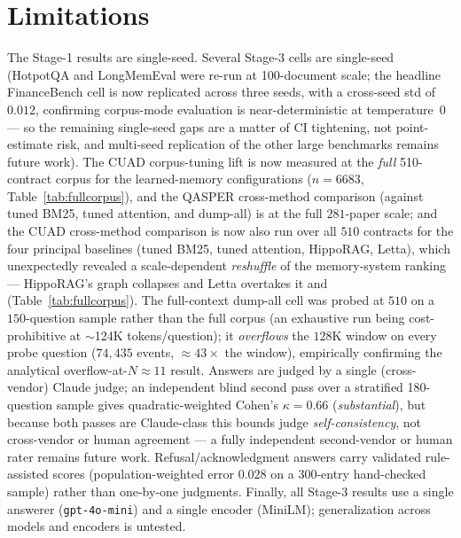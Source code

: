 \section{Limitations}
The Stage-1 results are single-seed. Several Stage-3 cells are single-seed
(HotpotQA and LongMemEval were re-run at 100-document scale; the headline
FinanceBench cell is now replicated across three seeds, with a cross-seed std of
$0.012$, confirming corpus-mode evaluation is near-deterministic at
temperature~0 --- so the remaining single-seed gaps are a matter of CI tightening,
not point-estimate risk, and multi-seed replication of the other large benchmarks
remains future work). The CUAD corpus-tuning lift is now measured at the
\emph{full} 510-contract corpus for the learned-memory configurations
($n{=}6683$, Table~\ref{tab:fullcorpus}), and the QASPER cross-method comparison
(against tuned BM25, tuned attention, and dump-all) is at the full $281$-paper
scale; and the CUAD cross-method comparison is now also run over all $510$
contracts for the four principal baselines (tuned BM25, tuned attention, HippoRAG,
Letta), which unexpectedly revealed a scale-dependent \emph{reshuffle} of the
memory-system ranking --- HippoRAG's graph collapses and Letta overtakes it and
\Vt{} (Table~\ref{tab:fullcorpus}). The full-context dump-all cell was probed at
$510$ on a $150$-question sample rather than the full corpus (an exhaustive run
being cost-prohibitive at $\sim$124K tokens/question); it \emph{overflows} the
$128$K window on every probe question ($74{,}435$ events, $\approx 43\times$ the
window), empirically confirming the analytical overflow-at-$N{\approx}11$ result.
Answers are judged by a single (cross-vendor) Claude judge; an independent blind
second pass over a stratified 180-question sample gives quadratic-weighted
Cohen's $\kappa=0.66$ (\emph{substantial}), but because both passes are
Claude-class this bounds judge \emph{self-consistency}, not cross-vendor or human
agreement --- a fully independent second-vendor or human rater remains future
work. Refusal/acknowledgment answers carry validated rule-assisted scores
(population-weighted error $0.028$ on a 300-entry hand-checked sample) rather
than one-by-one judgments. Finally, all Stage-3 results use a single answerer
(\texttt{gpt-4o-mini}) and a single encoder (MiniLM); generalization across
models and encoders is untested.

